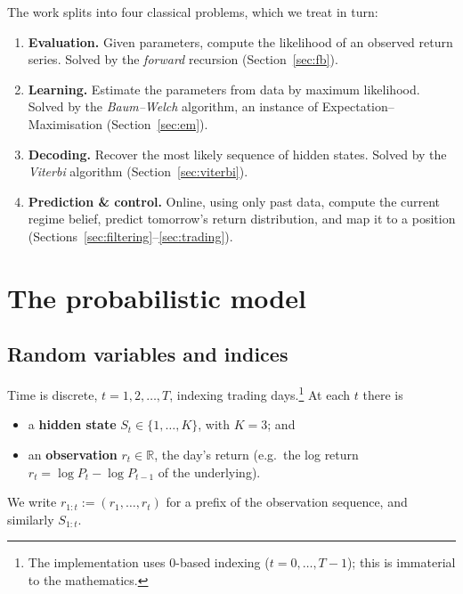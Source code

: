 \documentclass[11pt]{article}
\newcommand{\R}{\mathbb{R}}
\newcommand{\eqdef}{:=}
\newcommand{\state}{S}
\newcommand{\obs}{r}
\newcommand{\nstate}{K}
\theoremstyle{plain}
\theoremstyle{definition}
\theoremstyle{remark}
\begin{document}
The work splits into four classical problems, which we treat in turn:
\begin{enumerate}[label=(\Roman*),leftmargin=2.2em]
  \item \textbf{Evaluation.} Given parameters, compute the likelihood of an
        observed return series. Solved by the \emph{forward} recursion
        (Section~\ref{sec:fb}).
  \item \textbf{Learning.} Estimate the parameters from data by maximum
        likelihood. Solved by the \emph{Baum--Welch} algorithm, an instance of
        Expectation--Maximisation (Section~\ref{sec:em}).
  \item \textbf{Decoding.} Recover the most likely sequence of hidden states.
        Solved by the \emph{Viterbi} algorithm (Section~\ref{sec:viterbi}).
  \item \textbf{Prediction \& control.} Online, using only past data, compute
        the current regime belief, predict tomorrow's return distribution, and
        map it to a position (Sections~\ref{sec:filtering}--\ref{sec:trading}).
\end{enumerate}

\section{The probabilistic model}\label{sec:model}

\subsection{Random variables and indices}

Time is discrete, $t=1,2,\dots,T$, indexing trading days.\footnote{The
implementation uses $0$-based indexing ($t=0,\dots,T-1$); this is immaterial to
the mathematics.} At each $t$ there is
\begin{itemize}[leftmargin=1.6em]
  \item a \textbf{hidden state} $\state_t \in \{1,\dots,\nstate\}$, with
        $\nstate=3$; and
  \item an \textbf{observation} $\obs_t \in \R$, the day's return (e.g.\ the log
        return $\obs_t=\log P_t-\log P_{t-1}$ of the underlying).
\end{itemize}
We write $\obs_{1:t} \eqdef (\obs_1,\dots,\obs_t)$ for a prefix of the
observation sequence, and similarly $\state_{1:t}$.
\end{document}
